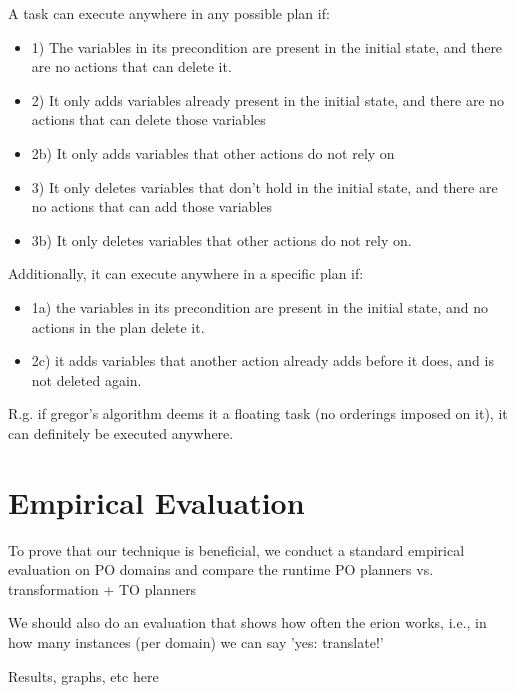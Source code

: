 A task can execute anywhere in any possible plan if: 
\begin{itemize}
\item 1) The variables in its precondition are present in the initial state, and there are no actions that can delete it.
\item 2) It only adds variables already present in the initial state, and there are no actions that can delete those variables
\item 2b) It only adds variables that other actions do not rely on
\item 3) It only deletes variables that don't hold in the initial state, and there are no actions that can add those variables
\item 3b) It only deletes variables that other actions do not rely on.
\end{itemize}


Additionally, it can execute anywhere in a specific plan if:
\begin{itemize}
\item 1a) the variables in its precondition are present in the initial state, and no actions in the plan delete it.
\item 2c) it adds variables that another action already adds before it does, and is not deleted again.
\end{itemize} 

R.g. if gregor's algorithm deems it a floating task (no orderings imposed on it),
it can definitely be executed anywhere.


\section{Empirical Evaluation}

To prove that our technique is beneficial, we conduct a standard empirical evaluation on PO domains and compare the runtime PO planners vs. transformation + TO planners

We should also do an evaluation that shows how often the erion works, i.e., in how many instances (per domain) we can say 'yes: translate!'

Results, graphs, etc here


